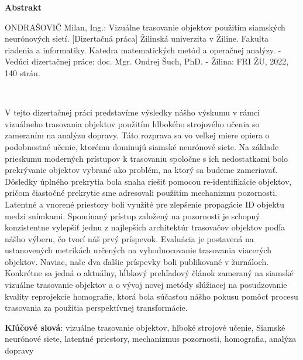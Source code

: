 \thispagestyle{empty}

\begin{center}
    \Large{\textbf{Abstrakt}}
\end{center}

\noindent ONDRAŠOVIČ Milan, Ing.: Vizuálne trasovanie objektov použitím siamských neurónových sietí.
[Dizertačná práca] Žilinská univerzita v Žiline. Fakulta riadenia a informatiky. Katedra matematických metód a operačnej analýzy. - Vedúci dizertačnej práce: doc. Mgr. Ondrej Šuch, PhD. - Žilina: FRI ŽU, 2022, 140 strán.

\

\noindent V tejto dizertačnej práci predstavíme výsledky nášho výskumu v rámci vizuálneho trasovania objektov použitím hlbokého strojového učenia so zameraním na analýzu dopravy. Táto rozprava sa vo veľkej miere opiera o podobnostné učenie, ktorému dominujú siamské neurónové siete. Na základe prieskumu moderných prístupov k trasovaniu spoločne s ich nedostatkami bolo prekrývanie objektov vybrané ako problém, na ktorý sa budeme zameriavať. Dôsledky úplného prekrytia bola snaha riešiť pomocou re-identifikácie objektov, pričom čiastočné prekrytie sme adresovali použitím mechanizmu pozornosti. Latentné a vnorené priestory boli využité pre zlepšenie propagácie ID objektu medzi snímkami. Spomínaný prístup založený na pozornosti je schopný konzistentne vylepšiť jednu z najlepších architektúr trasovačov objektov podľa nášho výberu, čo tvorí náš prvý príspevok. Evaluácia je postavená na ustanovených metrikách určených na vyhodnocovanie trasovania viacerých objektov. Naviac, naše dva ďalšie príspevky boli publikované v žurnáloch. Konkrétne sa jedná o aktuálny, hĺbkový prehľadový článok zameraný na siamské vizuálne trasovanie objektov a o vývoj novej metódy slúžiacej na posudzovanie kvality reprojekcie homografie, ktorá bola súčasťou nášho pokusu pomôcť procesu trasovania za použitia perspektívnej transformácie.

\noindent \textbf{Kľúčové slová}: vizuálne trasovanie objektov, hlboké strojové učenie, Siamské neurónové siete, latentné priestory, mechanizmus pozornosti, homografia, analýza dopravy
